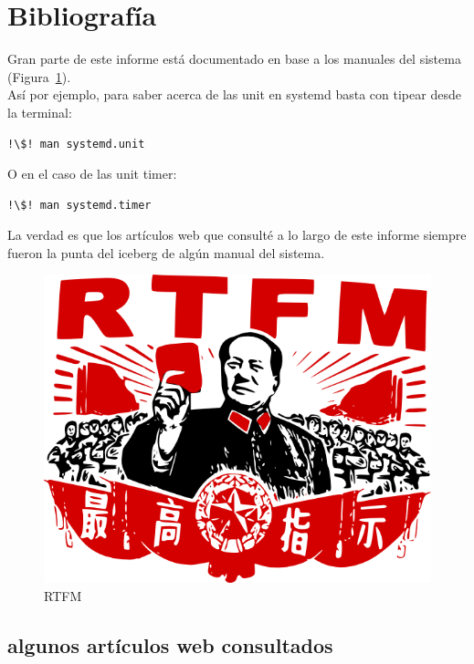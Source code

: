 \documentclass[10pt,a4paper]{article}
\begin{document}
\section{Bibliograf\'ia}

Gran parte de este informe est\'a documentado en base a los manuales del sistema (Figura~\ref{fig:rtfm}).\\

As\'i por ejemplo, para saber acerca de las unit en systemd basta con tipear desde la terminal:

\begin{lstlisting}
!\$! man systemd.unit 
\end{lstlisting}

O en el caso de las unit timer:

\begin{lstlisting}
!\$! man systemd.timer 
\end{lstlisting}

La verdad es que los art\'iculos web que consult\'e a lo largo de este informe siempre fueron la punta del iceberg de alg\'un manual del sistema.

\begin{figure}
\centering
    \includegraphics[scale=0.25]{Mao_RTFM.png}
    \caption{RTFM}
    \label{fig:rtfm}
\end{figure}

\subsection{algunos art\'iculos web consultados}
\end{document}
